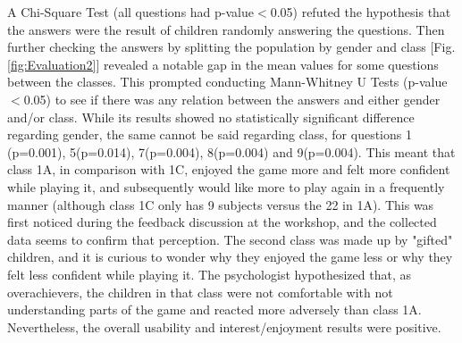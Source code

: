 \par A Chi-Square Test (all questions had p-value$<$0.05) refuted the hypothesis that the answers were the result of children randomly answering the questions. Then further checking the answers by splitting the population by gender and class [Fig.\ref{fig:Evaluation2}] revealed a notable gap in the mean values for some questions between the classes. This prompted conducting Mann-Whitney U Tests (p-value$<$0.05) to see if there was any relation between the answers and either gender and/or class. While its results showed no statistically significant difference regarding gender, the same cannot be said regarding class, for questions 1 (p=0.001), 5(p=0.014), 7(p=0.004), 8(p=0.004) and 9(p=0.004). This meant that class 1A, in comparison with 1C, enjoyed the game more and felt more confident while playing it, and subsequently would like more to play again in a frequently manner (although class 1C only has 9 subjects versus the 22 in 1A). This was first noticed during the feedback discussion at the workshop, and the collected data seems to confirm that perception. The second class was made up by "gifted" children, and it is curious to wonder why they enjoyed the game less or why they felt less confident while playing it. The psychologist hypothesized that, as overachievers, the children in that class were not comfortable with not understanding parts of the game and reacted more adversely than class 1A. Nevertheless, the overall usability and interest/enjoyment results were positive.
 
